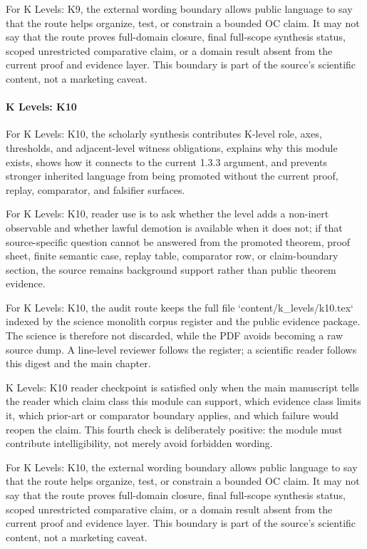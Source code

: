 For K Levels: K9, the external wording boundary allows public language to say that the route helps organize, test, or constrain a bounded OC claim. It may not say that the route proves full-domain closure, final full-scope synthesis status, scoped unrestricted comparative claim, or a domain result absent from the current proof and evidence layer. This boundary is part of the source's scientific content, not a marketing caveat.


\paragraph{K Levels: K10}

For K Levels: K10, the scholarly synthesis contributes K-level role, axes, thresholds, and adjacent-level witness obligations, explains why this module exists, shows how it connects to the current 1.3.3 argument, and prevents stronger inherited language from being promoted without the current proof, replay, comparator, and falsifier surfaces.


For K Levels: K10, reader use is to ask whether the level adds a non-inert observable and whether lawful demotion is available when it does not; if that source-specific question cannot be answered from the promoted theorem, proof sheet, finite semantic case, replay table, comparator row, or claim-boundary section, the source remains background support rather than public theorem evidence.


For K Levels: K10, the audit route keeps the full file `content/k\_levels/k10.tex` indexed by the science monolith corpus register and the public evidence package. The science is therefore not discarded, while the PDF avoids becoming a raw source dump. A line-level reviewer follows the register; a scientific reader follows this digest and the main chapter.


K Levels: K10 reader checkpoint is satisfied only when the main manuscript tells the reader which claim class this module can support, which evidence class limits it, which prior-art or comparator boundary applies, and which failure would reopen the claim. This fourth check is deliberately positive: the module must contribute intelligibility, not merely avoid forbidden wording.


For K Levels: K10, the external wording boundary allows public language to say that the route helps organize, test, or constrain a bounded OC claim. It may not say that the route proves full-domain closure, final full-scope synthesis status, scoped unrestricted comparative claim, or a domain result absent from the current proof and evidence layer. This boundary is part of the source's scientific content, not a marketing caveat.


